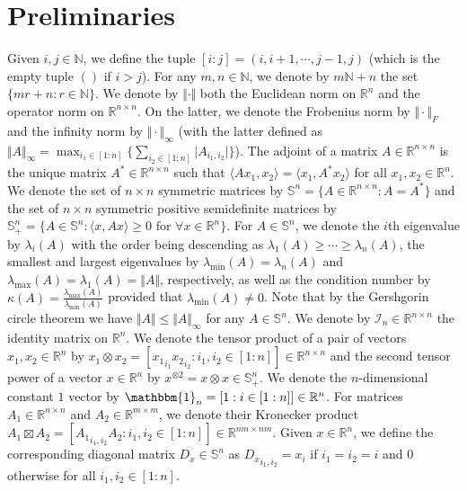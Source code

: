 \documentclass[twoside,11pt]{article}
\newcommand{\R}{\mathbb{R}}
\newcommand{\N}{\mathbb{N}}
\newcommand{\Id}{\mathcal{I}}
\begin{document}
\section{Preliminaries}\label{preliminaries}

Given $i, j \in \N$, we define the tuple $[i:j] = (i,i+1,\cdots,j-1,j)$ (which is the empty tuple $()$ if $i > j$). For any $m, n \in \N$, we denote by $m\N+n$ the set $\{mr+n : r \in \N\}$. We denote by $\Vert \cdot \Vert$ both the Euclidean norm on $\R^n$ and the operator norm on $\R^{n \times n}$. On the latter, we denote the Frobenius norm by $\Vert \cdot \Vert_F$ and the infinity norm by $\Vert \cdot \Vert_\infty$ (with the latter defined as $\Vert A \Vert_\infty = \max_{i_1 \in [1:n]}\{ \sum_{i_2 \in [1:n]} \vert A_{i_1,i_2} \vert \}$). The adjoint of a matrix $A \in \R^{n \times n}$ is the unique matrix $A^* \in \R^{n \times n}$ such that $\langle A x_1, x_2 \rangle = \langle x_1, A^* x_2 \rangle$ for all $x_1,x_2 \in \R^n$. We denote the set of $n \times n$ symmetric matrices by $\mathbb{S}^n = \{ A \in \R^{n \times n} : A = A^*\}$ and the set of $n \times n$ symmetric positive semidefinite matrices by $\mathbb{S}^n_+ = \{ A \in \mathbb{S}^n : \langle x, A x \rangle \geq 0 \text{ for } \forall x \in \R^n \}$. For $A \in \mathbb{S}^n$, we denote the $i$th eigenvalue by $\lambda_i(A)$ with the order being descending as $\lambda_1(A) \geq \cdots \geq \lambda_n(A)$, the smallest and largest eigenvalues by $\lambda_{\min}(A)=\lambda_n(A)$ and $\lambda_{\max}(A)=\lambda_1(A)=\Vert A \Vert$, respectively, as well as the condition number by $\kappa(A) = \frac{\lambda_{\max}(A)}{\lambda_{\min}(A)}$ provided that $\lambda_{\min}(A)\not=0$. Note that by the Gershgorin circle theorem we have $\Vert A \Vert \leq \Vert A \Vert_\infty$ for any $A \in \mathbb{S}^n$. We denote by $\Id_n \in \R^{n \times n}$ the identity matrix on $\R^n$. We denote the tensor product of a pair of vectors $x_1, x_2 \in \R^n$ by $x_1 \otimes x_2 = [ {x_1}_{i_1} {x_2}_{i_2} : i_1,i_2 \in [1:n]] \in \R^{n \times n}$ and the second tensor power of a vector $x \in \R^n$ by $x^{\otimes 2} = x \otimes x \in \mathbb{S}^n_+$. We denote the $n$-dimensional constant $1$ vector by $\mathbbm{1}_n = [ 1 : i \in [1:n]] \in \R^n$. For matrices $A_1 \in \R^{n \times n}$ and $A_2 \in \R^{m \times m}$, we denote their Kronecker product $A_1 \boxtimes A_2 = [ {A_1}_{i_1,i_2} A_2 : i_1,i_2 \in [1:n]] \in \R^{nm \times nm}$. Given $x \in \R^n$, we define the corresponding diagonal matrix $D_x \in \mathbb{S}^n$ as ${D_x}_{i_1,i_2} = x_i$ if $i_1 = i_2 = i$ and $0$ otherwise for all $i_1,i_2 \in [1:n]$.
\end{document}
